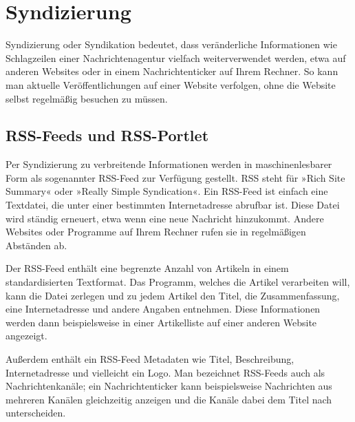 \documentclass[a4paper,12pt,ngerman]{manual}
\begin{document}
\resetcurrentobjects
\hypertarget{--doc-umgang/syndizierung}{}

\hypertarget{sec-syndizierung}{}\section{Syndizierung}

Syndizierung oder Syndikation bedeutet, dass veränderliche
Informationen wie Schlagzeilen einer Nachrichtenagentur vielfach
weiterverwendet werden, etwa auf anderen Websites oder in einem
Nachrichtenticker auf Ihrem Rechner. So kann man aktuelle
Veröffentlichungen auf einer Website verfolgen, ohne die Website
selbst regelmäßig besuchen zu müssen.


\hypertarget{sec-rss}{}\subsection{RSS-Feeds und RSS-Portlet}

Per Syndizierung zu verbreitende Informationen werden in
maschinenlesbarer Form als sogenannter RSS-Feed zur Verfügung
gestellt. RSS steht für »Rich Site Summary« oder »Really Simple
Syndication«. Ein RSS-Feed ist einfach eine Textdatei, die unter einer
bestimmten Internetadresse abrufbar ist. Diese Datei wird ständig
erneuert, etwa wenn eine neue Nachricht hinzukommt. Andere Websites
oder Programme auf Ihrem Rechner rufen sie in regelmäßigen Abständen
ab.

Der RSS-Feed enthält eine begrenzte Anzahl von Artikeln
in einem standardisierten Textformat. Das Programm, welches die Artikel
verarbeiten will, kann die Datei zerlegen und zu jedem Artikel
den Titel, die Zusammenfassung, eine Internetadresse und andere
Angaben entnehmen. Diese Informationen werden dann beispielsweise in einer
Artikelliste auf einer anderen Website angezeigt.

Außerdem enthält ein RSS-Feed Metadaten wie Titel, Beschreibung,
Internetadresse und vielleicht ein Logo. Man bezeichnet RSS-Feeds auch als
Nachrichtenkanäle; ein Nachrichtenticker kann beispielsweise Nachrichten aus
mehreren Kanälen gleichzeitig anzeigen und die Kanäle dabei dem Titel nach
unterscheiden.
\end{document}
